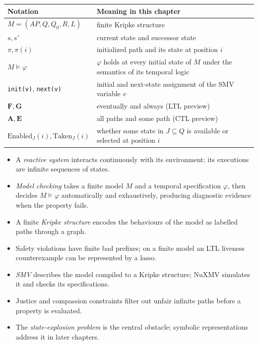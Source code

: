 \begin{center}
\small
\begin{tabular}{@{}p{4.2cm}p{8.35cm}@{}}
  \toprule
  \textbf{Notation} & \textbf{Meaning in this chapter} \\
  \midrule
  \(M=(AP,Q,Q_0,R,L)\) & finite Kripke structure \\
  \(s,s'\) & current state and successor state \\
  \(\pi,\pi(i)\) & initialized path and its state at position \(i\) \\
  \(M\models\varphi\) & \(\varphi\) holds at every initial state of \(M\)
                         under the semantics of its temporal logic \\
  \texttt{init(v)}, \texttt{next(v)} & initial and next-state assignment of
                                        the SMV variable \(v\) \\
  \(\mathbf{F},\mathbf{G}\) & eventually and always (LTL preview) \\
  \(\mathbf{A},\mathbf{E}\) & all paths and some path (CTL preview) \\
  \(\mathrm{Enabled}_J(i),\mathrm{Taken}_J(i)\) & whether some state in
                              \(J\subseteq Q\) is available or selected at
                              position \(i\) \\
  \bottomrule
\end{tabular}
\end{center}

\begin{summarybox}
\begin{itemize}[nosep]
  \item A \emph{reactive system} interacts continuously with its
    environment; its executions are infinite sequences of states.
  \item \emph{Model checking} takes a finite model \(M\) and a temporal
    specification \(\varphi\), then decides \(M\models\varphi\)
    automatically and exhaustively, producing diagnostic evidence when the
    property fails.
  \item A finite \emph{Kripke structure} encodes the behaviours of the model
    as labelled paths through a graph.
  \item Safety violations have finite bad prefixes; on a finite model an LTL
    liveness counterexample can be represented by a lasso.
  \item \emph{SMV} describes the model compiled to a Kripke structure;
    NuXMV simulates it and checks its specifications.
  \item Justice and compassion constraints filter out unfair infinite paths
    before a property is evaluated.
  \item The \emph{state-explosion problem} is the central obstacle; symbolic
    representations address it in later chapters.
\end{itemize}
\end{summarybox}

